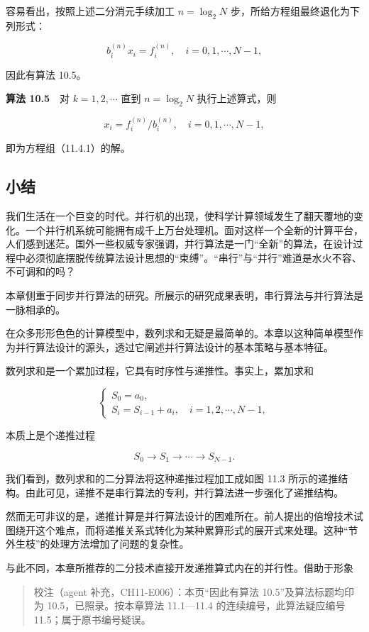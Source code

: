 \documentclass[
  10pt,
  fontset=fandol]{ctexart}
\begin{document}
容易看出，按照上述二分消元手续加工 \(n=\log_2 N\) 步，所给方程组最终退化为下列形式：

\[
b_i^{(n)}x_i=f_i^{(n)},\quad i=0,1,\cdots,N-1,
\]

因此有算法 10.5。

\textbf{算法 10.5}　对 \(k=1,2,\cdots\) 直到 \(n=\log_2 N\) 执行上述算式，则

\[
x_i=f_i^{(n)}/b_i^{(n)},\quad i=0,1,\cdots,N-1,
\]

即为方程组（11.4.1）的解。

\subsection{小结}\label{ux5c0fux7ed3}

我们生活在一个巨变的时代。并行机的出现，使科学计算领域发生了翻天覆地的变化。一个并行机系统可能拥有成千上万台处理机。面对这样一个全新的计算平台，人们感到迷茫。国外一些权威专家强调，并行算法是一门``全新''的算法，在设计过程中必须彻底摆脱传统算法设计思想的``束缚''。``串行''与``并行''难道是水火不容、不可调和的吗？

本章侧重于同步并行算法的研究。所展示的研究成果表明，串行算法与并行算法是一脉相承的。

在众多形形色色的计算模型中，数列求和无疑是最简单的。本章以这种简单模型作为并行算法设计的源头，透过它阐述并行算法设计的基本策略与基本特征。

数列求和是一个累加过程，它具有时序性与递推性。事实上，累加求和

\[
\begin{cases}
S_0=a_0,\\
S_i=S_{i-1}+a_i,\quad i=1,2,\cdots,N-1,
\end{cases}
\]

本质上是个递推过程

\[
S_0\to S_1\to\cdots\to S_{N-1}.
\]

我们看到，数列求和的二分算法将这种递推过程加工成如图 11.3 所示的递推结构。由此可见，递推不是串行算法的专利，并行算法进一步强化了递推结构。

然而无可非议的是，递推计算是并行算法设计的困难所在。前人提出的倍增技术试图绕开这个难点，而将递推关系式转化为某种累算形式的展开式来处理。这种``节外生枝''的处理方法增加了问题的复杂性。

与此不同，本章所推荐的二分技术直接开发递推算式内在的并行性。借助于形象

\begin{quote}
校注（agent 补充，CH11-E006）：本页``因此有算法 10.5''及算法标题均印为 10.5，已照录。按本章算法 11.1---11.4 的连续编号，此算法疑应编号 11.5；属于原书编号疑误。
\end{quote}
\end{document}
